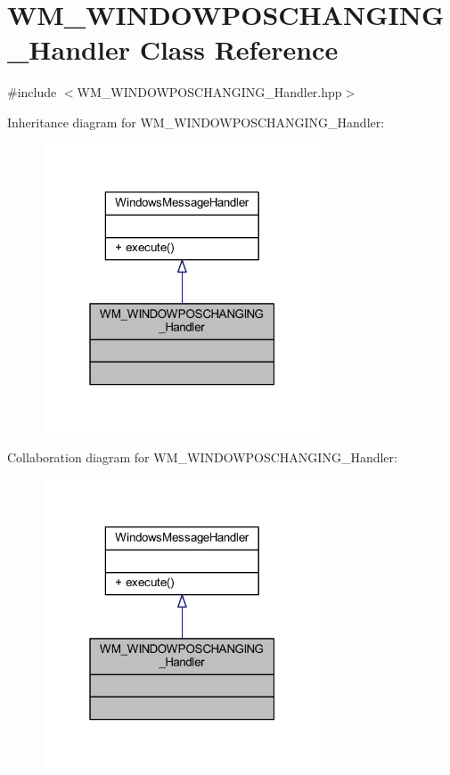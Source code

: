 \hypertarget{class_w_m___w_i_n_d_o_w_p_o_s_c_h_a_n_g_i_n_g___handler}{}\section{W\+M\+\_\+\+W\+I\+N\+D\+O\+W\+P\+O\+S\+C\+H\+A\+N\+G\+I\+N\+G\+\_\+\+Handler Class Reference}
\label{class_w_m___w_i_n_d_o_w_p_o_s_c_h_a_n_g_i_n_g___handler}


{\ttfamily \#include $<$W\+M\+\_\+\+W\+I\+N\+D\+O\+W\+P\+O\+S\+C\+H\+A\+N\+G\+I\+N\+G\+\_\+\+Handler.\+hpp$>$}



Inheritance diagram for W\+M\+\_\+\+W\+I\+N\+D\+O\+W\+P\+O\+S\+C\+H\+A\+N\+G\+I\+N\+G\+\_\+\+Handler\+:\nopagebreak
\begin{figure}[H]
\begin{center}
\leavevmode
\includegraphics[width=235pt]{class_w_m___w_i_n_d_o_w_p_o_s_c_h_a_n_g_i_n_g___handler__inherit__graph}
\end{center}
\end{figure}


Collaboration diagram for W\+M\+\_\+\+W\+I\+N\+D\+O\+W\+P\+O\+S\+C\+H\+A\+N\+G\+I\+N\+G\+\_\+\+Handler\+:\nopagebreak
\begin{figure}[H]
\begin{center}
\leavevmode
\includegraphics[width=235pt]{class_w_m___w_i_n_d_o_w_p_o_s_c_h_a_n_g_i_n_g___handler__coll__graph}
\end{center}
\end{figure}
